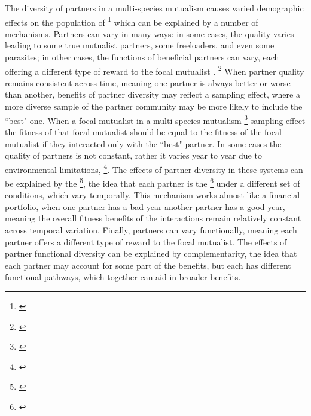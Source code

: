 \documentclass[12pt,a4paper]{article}
\newcommand{\tom}[2]{{\color{red}{#1}}\footnote{\textit{\color{red}{#2}}}}
\newcommand{\ali}[2]{{\color{blue}{#1}}\footnote{\textit{\color{blue}{#2}}}}
\begin{document}
The diversity of partners in a multi-species mutualism causes varied demographic effects on the population of \tom{the focal mutualist}{I think you should introduce the idea of a `focal mutualist' more clearly.} which can be explained by a number of mechanisms.
Partners can vary in many ways: in some cases, the quality varies leading to some true mutualist partners, some freeloaders, and even some parasites\cite{Bronstein1994, Afkhami2014,Song2020,West2007,Frederickson2013}; in other cases, the functions of beneficial partners can vary, each offering a different type of reward to the focal mutualist \cite{Stanton2003}.
\tom{Partner quality variations can remain consistent across years and life stages of the focal mutualist or they can shift year to year or in response to different types of stressors. }{SHould cite.}
When partner quality remains consistent across time, meaning one partner is always better or worse than another, benefits of partner diversity may reflect a sampling effect, where a more diverse sample of the partner community may be more likely to include the ``best" one\cite{Batstone2018}.
When a focal mutualist in a multi-species mutualism \ali{experiences}{not sure if this is the right word - not the right word. A focal mutualist does not experience a sampling effect. The sampling effect is a mechanism for positive effects of diversity.} sampling effect the fitness of that focal mutualist should be equal to the fitness of the focal mutualist if they interacted only with the ``best" partner. 
In some cases the quality of partners is not constant, rather it varies year to year due to environmental limitations, \tom{such as resource shortages and niche shifts}{Unclear what this means.}.
The effects of partner diversity in these systems can be explained by the \tom{portfolio effect}{I would discuss this last, after sampling effect and complementarity.}, the idea that each partner is the \tom{``best"}{I would not keep using this in quotations and instead find the right scientific language for what you are trying to say.} under a different set of conditions, which vary temporally\cite{Winfree2020,Batstone2018}. 
This mechanism works almost like a financial portfolio, when one partner has a bad year another partner has a good year, meaning the overall fitness benefits of the interactions remain relatively constant across temporal variation\cite{Batstone2018}.
Finally, partners can vary functionally, meaning each partner offers a different type of reward to the focal mutualist. 
The effects of partner functional diversity can be explained by complementarity, the idea that each partner may account for some part of the benefits, but each has different functional pathways, which together can aid in broader benefits\cite{Winfree2020,Batstone2018}.
\end{document}

